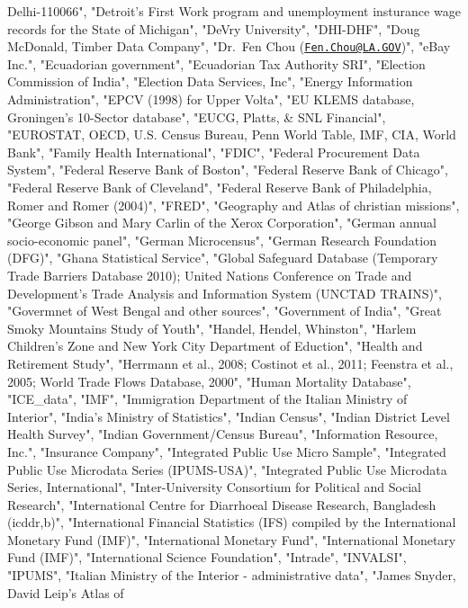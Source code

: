 \documentclass[]{article}
\begin{document}
\begin{itemize}
  Delhi-110066", "Detroit's First Work program and unemployment
  insturance wage records for the State of Michigan", "DeVry
  University", "DHI-DHF", "Doug McDonald, Timber Data Company", "Dr.~Fen
  Chou (\href{mailto:Fen.Chou@LA.GOV}{\nolinkurl{Fen.Chou@LA.GOV}})",
  "eBay Inc.", "Ecuadorian government", "Ecuadorian Tax Authority SRI",
  "Election Commission of India", "Election Data Services, Inc", "Energy
  Information Administration", "EPCV (1998) for Upper Volta", "EU KLEMS
  database, Groningen's 10-Sector database", "EUCG, Platts, \& SNL
  Financial", "EUROSTAT, OECD, U.S. Census Bureau, Penn World Table,
  IMF, CIA, World Bank", "Family Health International", "FDIC", "Federal
  Procurement Data System", "Federal Reserve Bank of Boston", "Federal
  Reserve Bank of Chicago", "Federal Reserve Bank of Cleveland",
  "Federal Reserve Bank of Philadelphia, Romer and Romer (2004)",
  "FRED", "Geography and Atlas of christian missions", "George Gibson
  and Mary Carlin of the Xerox Corporation", "German annual
  socio-economic panel", "German Microcensus", "German Research
  Foundation (DFG)", "Ghana Statistical Service", "Global Safeguard
  Database (Temporary Trade Barriers Database 2010); United Nations
  Conference on Trade and Development's Trade Analysis and Information
  System (UNCTAD TRAINS)", "Govermnet of West Bengal and other sources",
  "Government of India", "Great Smoky Mountains Study of Youth",
  "Handel, Hendel, Whinston", "Harlem Children's Zone and New York City
  Department of Eduction", "Health and Retirement Study", "Herrmann et
  al., 2008; Costinot et al., 2011; Feenstra et al., 2005; World Trade
  Flows Database, 2000", "Human Mortality Database", "ICE\_data", "IMF",
  "Immigration Department of the Italian Ministry of Interior", "India's
  Ministry of Statistics", "Indian Census", "Indian District Level
  Health Survey", "Indian Government/Census Bureau", "Information
  Resource, Inc.", "Insurance Company", "Integrated Public Use Micro
  Sample", "Integrated Public Use Microdata Series (IPUMS-USA)",
  "Integrated Public Use Microdata Series, International",
  "Inter-University Consortium for Political and Social Research",
  "International Centre for Diarrhoeal Disease Research, Bangladesh
  (icddr,b)", "International Financial Statistics (IFS) compiled by the
  International Monetary Fund (IMF)", "International Monetary Fund",
  "International Monetary Fund (IMF)", "International Science
  Foundation", "Intrade", "INVALSI", "IPUMS", "Italian Ministry of the
  Interior - administrative data", "James Snyder, David Leip's Atlas of

\end{itemize}
\end{document}
